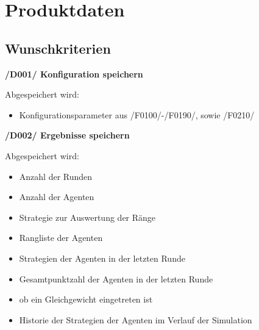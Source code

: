 \section{Produktdaten}

\subsection{Wunschkriterien}

\textbf{/D001/ Konfiguration speichern}

Abgespeichert wird:
\begin{itemize}
\item Konfigurationsparameter aus /F0100/-/F0190/, sowie /F0210/
\end{itemize}

\textbf{/D002/ Ergebnisse speichern}	

Abgespeichert wird:
\begin{itemize}
\item Anzahl der Runden
\item Anzahl der Agenten
\item Strategie zur Auswertung der Ränge
\item Rangliste der Agenten
\item Strategien der Agenten in der letzten Runde
\item Gesamtpunktzahl der Agenten in der letzten Runde
\item ob ein Gleichgewicht eingetreten ist
\item Historie der Strategien der Agenten im Verlauf der Simulation
\end{itemize}